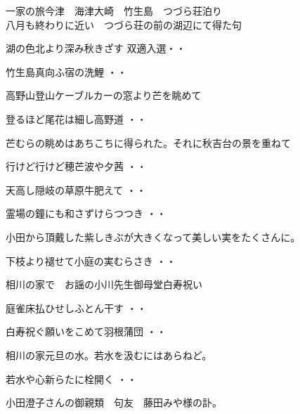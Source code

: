一家の旅今津　海津大崎　竹生島　つづら荘泊り\\
八月も終わりに近い　つづら荘の前の湖辺にて得た句
\begin{shiika}湖の色北より深み秋きざす
\hfill{双適入選・・}\end{shiika}
\begin{shiika}竹生島真向ふ宿の洗鯉
\hfill{・・}\end{shiika}
\vspace{0.6cm}
高野山登山ケーブルカーの窓より芒を眺めて
\begin{shiika}登るほど尾花は細し高野道
\hfill{・・}\end{shiika}
\vspace{0.6cm}
芒むらの眺めはあちこちに得られた。それに秋吉台の景を重ねて
\begin{shiika}行けど行けど穂芒波や夕茜
\hfill{・・}\end{shiika}
\vspace{0.6cm}
\begin{shiika}天高し隠岐の草原牛肥えて
\hfill{・・}\end{shiika}
\begin{shiika}霊場の鐘にも和さずけらつつき
\hfill{・・}\end{shiika}
\vspace{0.6cm}
小田から頂戴した紫しきぶが大きくなって美しい実をたくさんに。
\begin{shiika}下枝より褪せて小庭の実むらさき
\hfill{・・}\end{shiika}
\vspace{0.6cm}
相川の家で　お謡の小川先生御母堂白寿祝い
\begin{shiika}庭雀床払ひせしふとん干す
\hfill{・・}\end{shiika}
\begin{shiika}白寿祝ぐ願いをこめて羽根蒲団
\hfill{・・}\end{shiika}
相川の家元旦の水。若水を汲むにはあらねど。
\begin{shiika}若水や心新らたに栓開く
\hfill{・・}\end{shiika}
\vspace{0.6cm}
小田澄子さんの御親類　句友　藤田みや様の訃。

